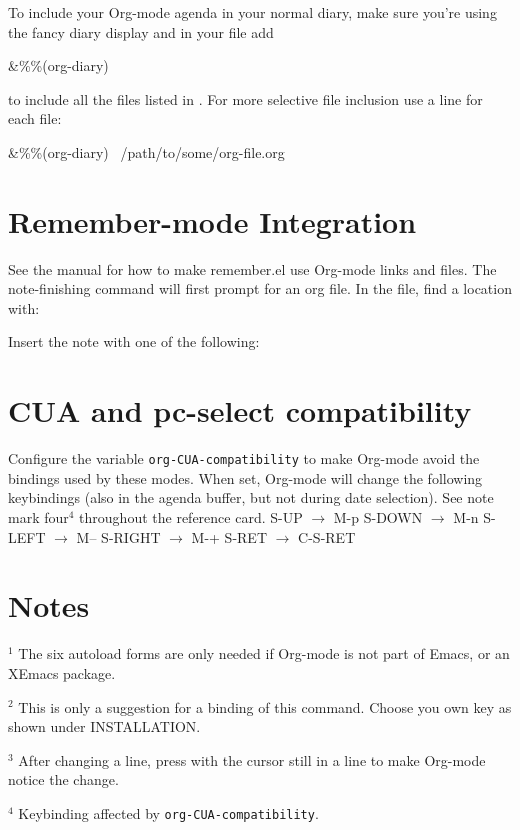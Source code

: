 To include your Org-mode agenda in your normal diary, make sure you're
using the fancy diary display
%
%
and in your  file add

\beginexample%
\&\%\%(org-diary)
\endexample

to include all the files listed in .  For more
selective file inclusion use a line for each file:

\beginexample%
\&\%\%(org-diary) ~/path/to/some/org-file.org
\endexample

\section{Remember-mode Integration}

See the manual for how to make remember.el use Org-mode links and
files.  The note-finishing command  will first prompt for
an org file. In the file, find a location with:


Insert the note with one of the following: 


\section{CUA and pc-select compatibility}

Configure the variable {\tt org-CUA-compatibility} to make Org-mode
avoid the  bindings used by these modes.  When set,
Org-mode will change the following keybindings (also in the agenda
buffer, but not during date selection). See note mark four$^4$
throughout the reference card.
\beginexample
S-UP    $\to$ M-p             S-DOWN  $\to$ M-n
S-LEFT  $\to$ M--             S-RIGHT $\to$ M-+
S-RET   $\to$ C-S-RET
\endexample

\section{Notes}
$^1$ The six autoload forms are only needed if Org-mode is not part of
Emacs, or an XEmacs package.

$^2$ This is only a suggestion for a binding of this command.  Choose
you own key as shown under INSTALLATION.

$^3$ After changing a  line, press  with
the cursor still in a line to make Org-mode notice the change.

$^4$ Keybinding affected by {\tt org-CUA-compatibility}.

\copyrightnotice

\bye



